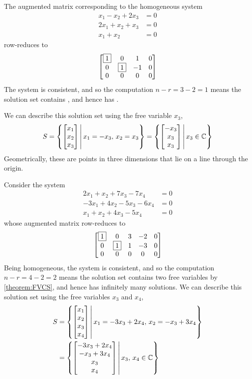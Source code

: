 \documentclass{ximera}
\begin{document}
\begin{example}
The augmented matrix corresponding to the homogeneous system
\begin{align*}
x_1 -x_2 +2x_3 & = 0\\
 2x_1+ x_2 + x_3 & = 0\\
 x_1 + x_2\quad\quad & = 0
\end{align*}
row-reduces to
\[
  \begin{bmatrix}
    \fbox{1} & 0 & 1 & 0 \\
    0 & \fbox{1} & -1 & 0\\
    0 & 0 & 0 & 0
  \end{bmatrix}
\]
The system is consistent, and so the computation $n-r=3-2=1$ means the solution set contains , and hence has .

\begin{feedback}[correct]
  We can describe this solution set using the free variable $x_3$,
  \[
    S=\left\lbrace\begin{bmatrix}x_1\\x_2\\x_3\end{bmatrix}\,\middle|\,x_1=-x_3,\,x_2=x_3\right\rbrace
    =\left\lbrace\begin{bmatrix}-x_3\\x_3\\x_3\end{bmatrix}\,\middle|\,x_3\in\mathbb{C}\right\rbrace
  \]
Geometrically, these are points in three dimensions that lie on a line through the origin.
\end{feedback}

\end{example}

\begin{example}
Consider the system
\begin{align*}
2x_1  + x_2 + 7x_3 - 7x_4 &= 0 \\
-3x_1 + 4x_2 -5x_3 - 6x_4 &= 0 \\
x_1 +x_2 + 4x_3 - 5x_4 &=  0
\end{align*}
whose augmented matrix row-reduces to
\[
  \begin{bmatrix}
    \fbox{1} & 0 & 3 & -2 & 0 \\
    0 & \fbox{1} & 1 &  -3 & 0\\
    0 & 0 & 0 &  0 & 0
  \end{bmatrix}
\]
Being homogeneous, the system is consistent, and so the computation $n-r=4-2=2$ means the solution set contains two free variables by \ref{theorem:FVCS}, and hence has infinitely many solutions.  We can describe this solution set using the free variables $x_3$ and $x_4$,
\begin{align*}
  S&=\left\lbrace\begin{bmatrix}x_1\\x_2\\x_3\\x_4\end{bmatrix}\,\middle|\,x_1=-3x_3+2x_4,\,x_2=-x_3+3x_4\right\rbrace\\
   &=\left\lbrace\begin{bmatrix}-3x_3+2x_4\\-x_3+3x_4\\x_3\\x_4\end{bmatrix}\,\middle|\, x_3,\,x_4\in\mathbb{C}\right\rbrace\\
\end{align*}
\end{example}
\end{document}

